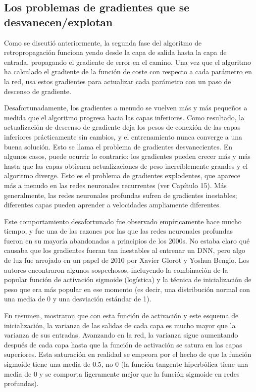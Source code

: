 \documentclass[11pt]{article}
\begin{document}
\subsection{Los problemas de gradientes que se desvanecen/explotan}
\label{sec:orgcf80cba}
Como se discutió anteriormente, la segunda fase del algoritmo de
retropropagación funciona yendo desde la capa de salida hasta la capa
de entrada, propagando el gradiente de error en el camino. Una vez que
el algoritmo ha calculado el gradiente de la función de coste con
respecto a cada parámetro en la red, usa estos gradientes para
actualizar cada parámetro con un paso de descenso de gradiente.

Desafortunadamente, los gradientes a menudo se vuelven más y más
pequeños a medida que el algoritmo progresa hacia las capas
inferiores. Como resultado, la actualización de descenso de gradiente
deja los pesos de conexión de las capas inferiores prácticamente sin
cambios, y el entrenamiento nunca converge a una buena solución. Esto
se llama el problema de gradientes desvanecientes. En algunos casos,
puede ocurrir lo contrario: los gradientes pueden crecer más y más
hasta que las capas obtienen actualizaciones de peso increíblemente
grandes y el algoritmo diverge. Esto es el problema de gradientes
explodentes, que aparece más a menudo en las redes neuronales
recurrentes (ver Capítulo 15). Más generalmente, las redes neuronales
profundas sufren de gradientes inestables; diferentes capas pueden
aprender a velocidades ampliamente diferentes.

Este comportamiento desafortunado fue observado empíricamente hace
mucho tiempo, y fue una de las razones por las que las redes
neuronales profundas fueron en su mayoría abandonadas a principios de
los 2000s. No estaba claro qué causaba que los gradientes fueran tan
inestables al entrenar un DNN, pero algo de luz fue arrojado en un
papel de 2010 por Xavier Glorot y Yoshua Bengio. Los autores
encontraron algunos sospechosos, incluyendo la combinación de la
popular función de activación sigmoide (logística) y la técnica de
inicialización de peso que era más popular en ese momento (es decir,
una distribución normal con una media de 0 y una desviación estándar
de 1).

En resumen, mostraron que con esta función de activación y este
esquema de inicialización, la varianza de las salidas de cada capa es
mucho mayor que la varianza de sus entradas. Avanzando en la red, la
varianza sigue aumentando después de cada capa hasta que la función de
activación se satura en las capas superiores. Esta saturación en
realidad se empeora por el hecho de que la función sigmoide tiene una
media de 0.5, no 0 (la función tangente hiperbólica tiene una media de
0 y se comporta ligeramente mejor que la función sigmoide en redes
profundas).
\end{document}
